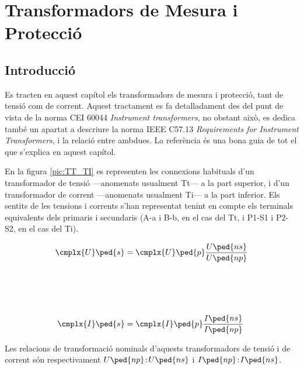 
\chapter{Transformadors de Mesura i Protecció}\label{sec:tr_mes_prot}


\section{Introducció}
Es tracten en aquest capítol els transformadors de
mesura i  protecció, tant de tensió com de corrent. Aquest
tractament es fa  detalladament des del punt de vista de la norma CEI 60044 \textit{Instrument transformers}, no obstant això, es dedica també un
apartat a descriure la norma  IEEE C57.13 \textit{Requirements for Instrument Transformers}, i la
relació entre ambdues. La referència \cite{KNU} és una bona guia de tot el que s'explica en aquest capítol.

En la figura \vref{pic:TT_TI} es representen les connexions
habituals d'un transformador de tensió ---anomenats usualment Tt---
 a la part superior, i d'un transformador de corrent ---anomenats
usualment Ti--- a la part inferior. Els sentits de les tensions
i corrents s'han representat tenint en compte els terminals
equivalents dels primaris i secundaris (\textsf{A-a} i \textsf{B-b}, en el cas del Tt, i \textsf{P1-S1} i \textsf{P2-S2}, en el cas del Ti).

\hfill
\begin{minipage}[b]{90mm}
    \hspace{1.5cm}
    
    \label{pic:TT_TI}
\end{minipage}
\hfill
\begin{minipage}[b][70mm][t]{50mm}
   \begin{align}
      \cmplx{U}\ped{s} &= \cmplx{U}\ped{p} \frac{U\ped{ns}}{U\ped{np}}
      \\[21mm]
      \cmplx{I}\ped{s} &= \cmplx{I}\ped{p} \frac{I\ped{ns}}{I\ped{np}}
   \end{align}
\end{minipage}

Les relacions de transformació nominals d'aquests transformadors de
tensió i de corrent són respectivament $U\ped{np}\!:\!U\ped{ns}$ i
$I\ped{np}\!:\!I\ped{ns}$.

